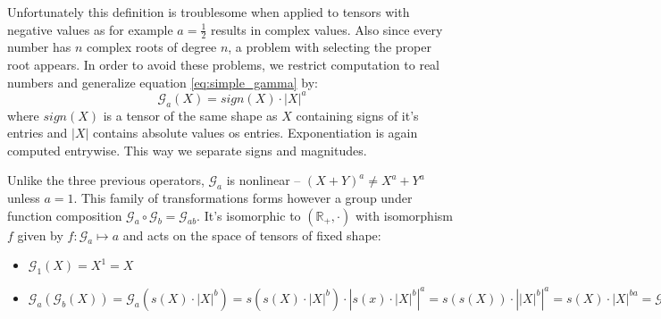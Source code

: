         Unfortunately this definition is troublesome when applied to tensors
        with negative values as for example $a=\frac{1}{2}$ results in
        complex values. Also since every number has $n$ complex roots of degree
        $n$, a problem with selecting the proper root appears. In order to avoid
        these problems, we restrict computation to real numbers and generalize
        equation \ref{eq:simple_gamma} by:
        \newcommand\mcg{\mathcal{G}}
        \begin{equation}
            \mathcal{G}_a(X) = \mathit{sign}(X)\cdot|X|^a
            \label{eq:gamma}
        \end{equation}
        where $\mathit{sign}(X)$ is a tensor of the same shape as $X$ containing
        signs of it's entries and $|X|$ contains absolute values os entries.
        Exponentiation is again computed entrywise. This way we separate signs
        and magnitudes.
        \par Unlike the three previous operators, $\mathcal{G}_a$ is nonlinear --
        $(X+Y)^a \neq X^a + Y^a$ unless $a=1$. This family of transformations forms however a
        group under function composition $\mcg_a \circ \mcg_b = \mcg_{ab}$.
        It's isomorphic to $(\mathbb{R}_+, \cdot)$ with isomorphism $f$
        given by $f:\mcg_a \mapsto a$ and acts on the space of
        tensors of fixed shape:
        \begin{itemize}
            \item $\mathcal{G}_1(X) = X^1 = X$
            \item $\mcg_a\left(\mcg_b\left(X\right)\right) =
                \mcg_a\left(s\left(X\right)\cdot\left|X\right|^b\right) =
                s\left(s\left(X\right)\cdot\left|X\right|^b\right)
                \cdot\left|s\left(x\right)\cdot\left|X\right|^b\right|^a = 
                s\left(s\left(X\right)\right)\cdot\left|\left|X\right|^b\right|^a
                = s\left(X\right)\cdot\left|X\right|^{ba} = \mcg_{ab}(X)$
        \end{itemize}



